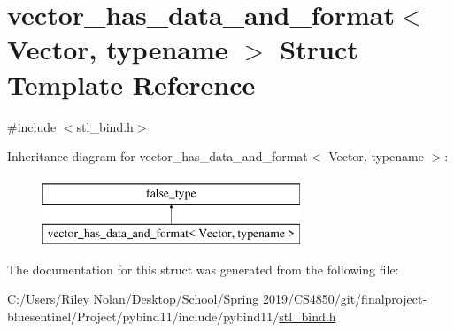 \hypertarget{structvector__has__data__and__format}{}\section{vector\+\_\+has\+\_\+data\+\_\+and\+\_\+format$<$ Vector, typename $>$ Struct Template Reference}
\label{structvector__has__data__and__format}


{\ttfamily \#include $<$stl\+\_\+bind.\+h$>$}

Inheritance diagram for vector\+\_\+has\+\_\+data\+\_\+and\+\_\+format$<$ Vector, typename $>$\+:\begin{figure}[H]
\begin{center}
\leavevmode
\includegraphics[height=2.000000cm]{structvector__has__data__and__format}
\end{center}
\end{figure}


The documentation for this struct was generated from the following file\+:\begin{DoxyCompactItemize}
\item 
C\+:/\+Users/\+Riley Nolan/\+Desktop/\+School/\+Spring 2019/\+C\+S4850/git/finalproject-\/bluesentinel/\+Project/pybind11/include/pybind11/\mbox{\hyperlink{stl__bind_8h}{stl\+\_\+bind.\+h}}\end{DoxyCompactItemize}
